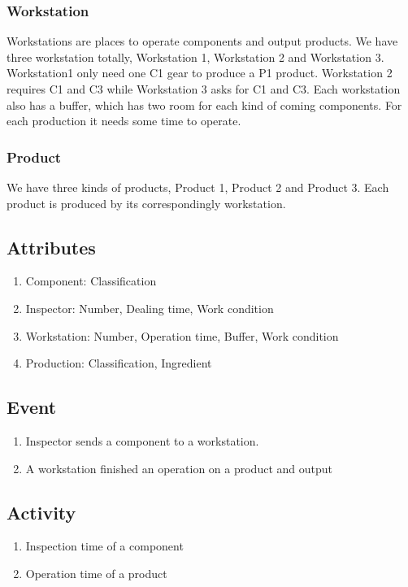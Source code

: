 \documentclass{article}
\begin{document}
\subsubsection{Workstation}

Workstations are places to operate components and output products. We have three workstation totally, Workstation 1, Workstation 2 and Workstation 3. Workstation1 only need one C1 gear to produce a P1 product. Workstation 2 requires C1 and C3 while Workstation 3 asks for C1 and C3. Each workstation also has a buffer, which has two room for each kind of coming components. For each production it needs some time to operate.

\subsubsection{Product}

We have three kinds of products, Product 1, Product 2 and Product 3. Each product is produced by its correspondingly workstation. 

\subsection{Attributes}

\begin{enumerate}
\item Component: Classification
\item Inspector: Number, Dealing time, Work condition
\item Workstation: Number, Operation time, Buffer, Work condition
\item Production: Classification, Ingredient
\end{enumerate}

\subsection{Event}

\begin{enumerate}
\item Inspector sends a component to a workstation.
\item A workstation finished an operation on a product and output

\end{enumerate}

\subsection{Activity}
\begin{enumerate}
\item Inspection time of a component
\item Operation time of a product
\end{enumerate}
\end{document}
